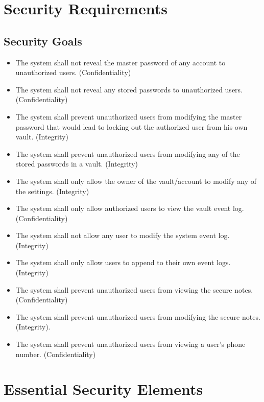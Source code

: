 \documentclass{article}
\begin{document}
\section{Security Requirements}
\label{sec:security_requirements}

\subsection{Security Goals}
\label{sub:security_goals}
\begin{itemize}
  \item The system shall not reveal the master password of any account to unauthorized users. (Confidentiality)
  \item The system shall not reveal any stored passwords to unauthorized users. (Confidentiality)
  \item The system shall prevent unauthorized users from modifying the master password that would lead to locking out the authorized user from his own vault. (Integrity)
  \item The system shall prevent unauthorized users from modifying any of the stored passwords in a vault. (Integrity)
  \item The system shall only allow the owner of the vault/account to modify any of the settings. (Integrity)
  \item The system shall only allow authorized users to view the vault event log. (Confidentiality)
  \item The system shall not allow any user to modify the system event log. (Integrity)
  \item The system shall only allow users to append to their own event logs. (Integrity)
  \item The system shall prevent unauthorized users from viewing the secure notes. (Confidentiality)
  \item The system shall prevent unauthorized users from modifying the secure notes. (Integrity).
  \item The system shall prevent unauthorized users from viewing a user's phone number. (Confidentiality)
\end{itemize}

\section{Essential Security Elements}
\label{sec:essential_security_elements}
\end{document}
